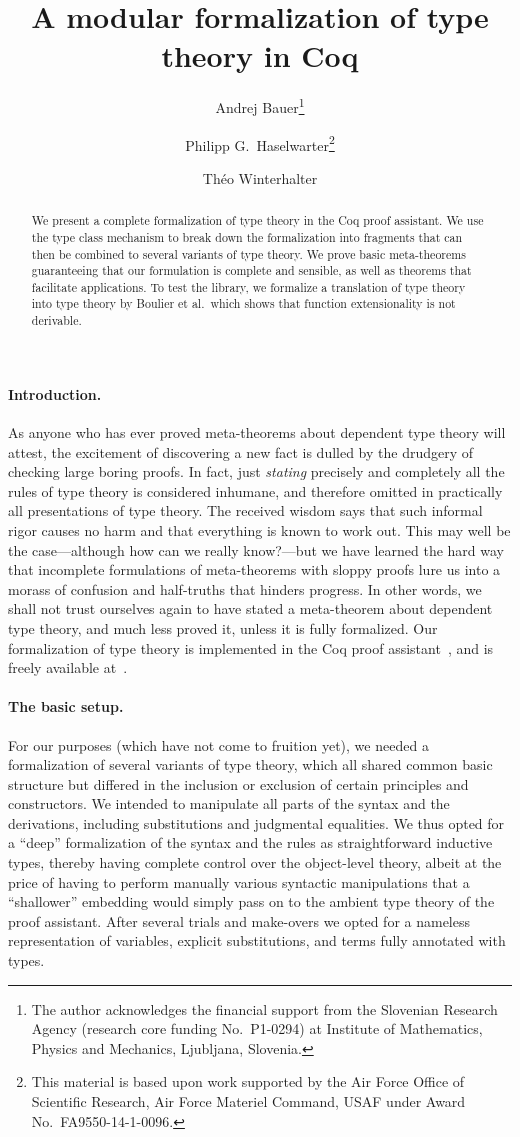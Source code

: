 \documentclass{easychair}
\title{A modular formalization of type theory in Coq}
\author{
Andrej Bauer\inst{1}\thanks{
The author acknowledges the financial support from the Slovenian Research Agency (research core funding No.~P1-0294) at Institute of Mathematics, Physics and Mechanics, Ljubljana, Slovenia.}
\and
Philipp G.~Haselwarter\inst{2}\thanks{This material is based upon work supported by the Air Force Office of Scientific Research, Air Force Materiel Command, USAF under Award No.~FA9550-14-1-0096.}
\and
Théo Winterhalter\inst{3}
}
\institute{
  University of Ljubljana, Slovenia\\
  \email{Andrej.Bauer@andrej.com}
\and
  University of Ljubljana, Slovenia\\
  \email{philipp@haselwarter.org}
\and
   École Normale Supérieure Paris-Saclay, France\\
   \email{theo.winterhalter@ens-cachan.fr}
}
\begin{document}
\maketitle

\begin{abstract}
  We present a complete formalization of type theory in the Coq proof assistant. We use
  the type class mechanism to break down the formalization into fragments that can then be
  combined to several variants of type theory. We prove basic meta-theorems guaranteeing
  that our formulation is complete and sensible, as well as theorems that facilitate
  applications. To test the library, we formalize a translation of type theory into type
  theory by Boulier et al.\ which shows that function extensionality is not derivable.
\end{abstract}

\paragraph*{Introduction.}
\label{sec:introduction}

As anyone who has ever proved meta-theorems about dependent type theory will attest, the
excitement of discovering a new fact is dulled by the drudgery of checking large boring
proofs. In fact, just \emph{stating} precisely and completely all the rules of type theory
is considered inhumane, and therefore omitted in practically all presentations of type
theory. The received wisdom says that such informal rigor causes no harm and that
everything is known to work out. This may well be the case---although how can we really
know?---but we have learned the hard way that incomplete formulations of meta-theorems
with sloppy proofs lure us into a morass of confusion and half-truths that hinders
progress. In other words, we shall not trust ourselves again to have stated a meta-theorem
about dependent type theory, and much less proved it, unless it is fully formalized. Our
formalization of type theory is implemented in the Coq proof assistant~\cite{coq}, and is
freely available at~\cite{reflections}.

\paragraph*{The basic setup.}
\label{sec:basic-setup}

For our purposes (which have not come to fruition yet), we needed a formalization of
several variants of type theory, which all shared common basic structure but differed in
the inclusion or exclusion of certain principles and constructors. We intended to
manipulate all parts of the syntax and the derivations, including substitutions and
judgmental equalities. We thus opted for a ``deep'' formalization of the syntax and the
rules as straightforward inductive types, thereby having complete control over the
object-level theory, albeit at the price of having to perform manually various syntactic
manipulations that a ``shallower'' embedding would simply pass on to the ambient type
theory of the proof assistant. After several trials and make-overs we opted for a nameless
representation of variables, explicit substitutions, and terms fully annotated with types.
\end{document}
